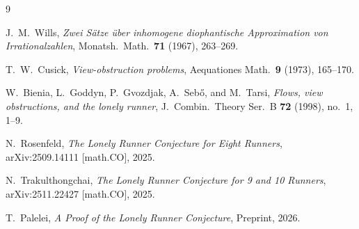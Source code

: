 \documentclass[11pt]{article}
\theoremstyle{definition}
\begin{document}
\begin{thebibliography}{9}

  J.~M.~Wills,
  \textit{Zwei S\"{a}tze \"{u}ber inhomogene diophantische Approximation
    von Irrationalzahlen},
  Monatsh.\ Math.\ \textbf{71} (1967), 263--269.

  T.~W.~Cusick,
  \textit{View-obstruction problems},
  Aequationes Math.\ \textbf{9} (1973), 165--170.

  W.~Bienia, L.~Goddyn, P.~Gvozdjak, A.~Seb{\H{o}}, and M.~Tarsi,
  \textit{Flows, view obstructions, and the lonely runner},
  J.\ Combin.\ Theory Ser.\ B \textbf{72} (1998), no.~1, 1--9.

  N.~Rosenfeld,
  \textit{The Lonely Runner Conjecture for Eight Runners},
  arXiv:2509.14111 [math.CO], 2025.

  N.~Trakulthongchai,
  \textit{The Lonely Runner Conjecture for 9 and 10 Runners},
  arXiv:2511.22427 [math.CO], 2025.

  T.~Palelei,
  \textit{A Proof of the Lonely Runner Conjecture},
  Preprint, 2026.

\end{thebibliography}
\end{document}
